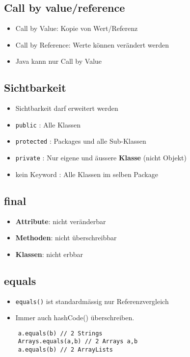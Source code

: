\begin{multicols*}{5}
	\subsection{Call by value/reference}
		\begin{itemize}
			\item Call by Value: Kopie von Wert/Referenz
			\item Call by Reference: Werte können verändert werden
			\item Java kann nur Call by Value
		\end{itemize}
	
	\subsection{Sichtbarkeit}
		\begin{itemize}
			\item Sichtbarkeit darf erweitert werden
			\item \tiny \textcolor{b}{\texttt{public}}
				\footnotesize : Alle Klassen
			\item \tiny \textcolor{b}{\texttt{protected}}
				\footnotesize : Packages und alle Sub-Klassen
			\item \tiny \textcolor{b}{\texttt{private}}
				\footnotesize : Nur eigene und äussere \textbf{Klasse} (nicht Objekt)
			\item \tiny kein Keyword
				\footnotesize : Alle Klassen im selben Package
		\end{itemize}
	
	
	\subsection{final}
		\begin{itemize}
			\item \textbf{Attribute}: nicht veränderbar
			\item \textbf{Methoden}: nicht überschreibbar
			\item \textbf{Klassen}: nicht erbbar
		\end{itemize}
	
	\subsection{equals}
		\begin{itemize}
			\item \tiny \textcolor{b}{\texttt{equals()}} 
				\footnotesize ist standardmässig nur Referenzvergleich
			\item Immer auch hashCode() überschreiben.
		\end{itemize}
\begin{lstlisting}
	a.equals(b) // 2 Strings
	Arrays.equals(a,b) // 2 Arrays a,b
	a.equals(b) // 2 ArrayLists
\end{lstlisting}
	

\end{multicols*}
